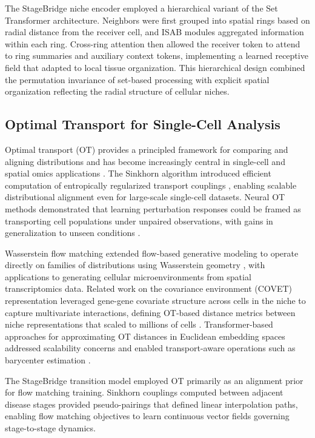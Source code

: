 The StageBridge niche encoder employed a hierarchical variant of the Set Transformer architecture. Neighbors were first grouped into spatial rings based on radial distance from the receiver cell, and ISAB modules aggregated information within each ring. Cross-ring attention then allowed the receiver token to attend to ring summaries and auxiliary context tokens, implementing a learned receptive field that adapted to local tissue organization. This hierarchical design combined the permutation invariance of set-based processing with explicit spatial organization reflecting the radial structure of cellular niches.


\subsection{Optimal Transport for Single-Cell Analysis}

Optimal transport (OT) provides a principled framework for comparing and aligning distributions and has become increasingly central in single-cell and spatial omics applications \cite{Bunne2024-pl}. The Sinkhorn algorithm introduced efficient computation of entropically regularized transport couplings \cite{Cuturi2013-li}, enabling scalable distributional alignment even for large-scale single-cell datasets. Neural OT methods demonstrated that learning perturbation responses could be framed as transporting cell populations under unpaired observations, with gains in generalization to unseen conditions \cite{Bunne2023-bm}.

Wasserstein flow matching extended flow-based generative modeling to operate directly on families of distributions using Wasserstein geometry \cite{Haviv2024-qe}, with applications to generating cellular microenvironments from spatial transcriptomics data. Related work on the covariance environment (COVET) representation leveraged gene-gene covariate structure across cells in the niche to capture multivariate interactions, defining OT-based distance metrics between niche representations that scaled to millions of cells \cite{Haviv2025-kd}. Transformer-based approaches for approximating OT distances in Euclidean embedding spaces addressed scalability concerns and enabled transport-aware operations such as barycenter estimation \cite{Haviv2024-uz}.

The StageBridge transition model employed OT primarily as an alignment prior for flow matching training. Sinkhorn couplings computed between adjacent disease stages provided pseudo-pairings that defined linear interpolation paths, enabling flow matching objectives to learn continuous vector fields governing stage-to-stage dynamics.


